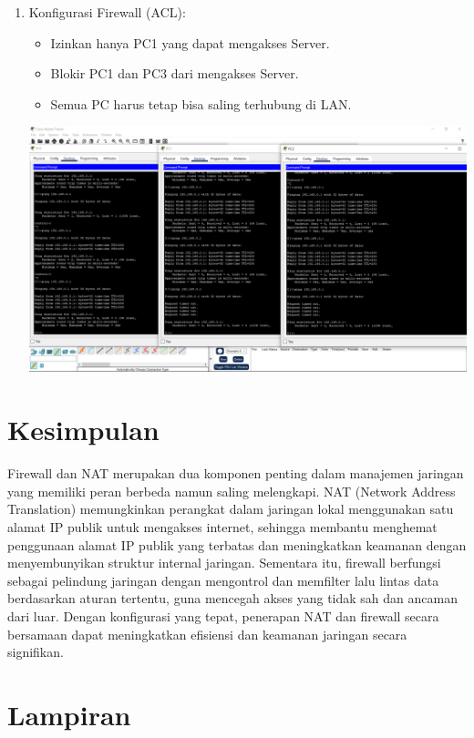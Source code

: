 \begin{enumerate}
    \item Konfigurasi Firewall (ACL):
    \begin{itemize}
        \item Izinkan hanya PC1 yang dapat mengakses Server.
        \item Blokir PC1 dan PC3 dari mengakses Server.
        \item Semua PC harus tetap bisa saling terhubung di LAN.
    \end{itemize}
    \begin{center}
        \includegraphics[scale=0.2]{P1/img/24.png}
    \end{center}
    
\end{enumerate}
\section{Kesimpulan}
Firewall dan NAT merupakan dua komponen penting dalam manajemen jaringan yang memiliki peran berbeda namun saling melengkapi. NAT (Network Address Translation) memungkinkan perangkat dalam jaringan lokal menggunakan satu alamat IP publik untuk mengakses internet, sehingga membantu menghemat penggunaan alamat IP publik yang terbatas dan meningkatkan keamanan dengan menyembunyikan struktur internal jaringan. Sementara itu, firewall berfungsi sebagai pelindung jaringan dengan mengontrol dan memfilter lalu lintas data berdasarkan aturan tertentu, guna mencegah akses yang tidak sah dan ancaman dari luar. Dengan konfigurasi yang tepat, penerapan NAT dan firewall secara bersamaan dapat meningkatkan efisiensi dan keamanan jaringan secara signifikan.
\section{Lampiran}

